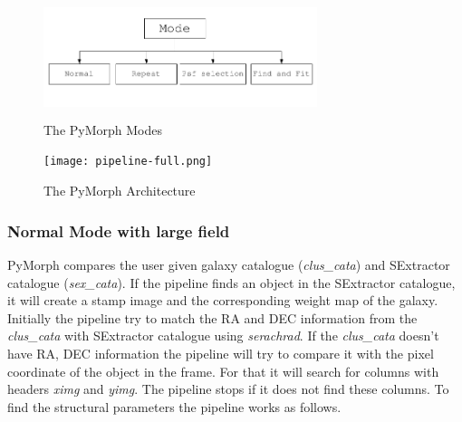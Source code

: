 \documentclass[a4paper,10pt]{article}
\begin{document}
 \begin{figure}%
 \centering
 \includegraphics[width=8cm, height=3.5cm, bb=0 0 641 234]{pipeline-arch1.png}
 \caption{The PyMorph Modes}
 \label{fig:arch1}
\end{figure}

 \begin{figure}%
 \centering
 \texttt{[image: pipeline-full.png]}
 \caption{The PyMorph Architecture}
 \label{fig:arch2}
\end{figure}

% 
% 


\subsubsection{Normal Mode with large field}
\label{normal}
PyMorph compares the user given galaxy catalogue (\textit{clus\_cata}) and SExtractor catalogue (\textit{sex\_cata}). If the pipeline finds an object in the SExtractor catalogue, it will create a stamp image and the corresponding weight map of the galaxy. Initially the pipeline try to match the RA and DEC information from the \textit{clus\_cata} with SExtractor catalogue using \textit{serachrad}. If the \textit{clus\_cata} doesn't have RA, DEC information the pipeline will try to compare it with the pixel coordinate of the object in the frame. For that it will search for columns with headers \textit{ximg} and \textit{yimg}. The pipeline stops if it does not find these columns. To find the structural parameters the pipeline works as follows.
\end{document}
